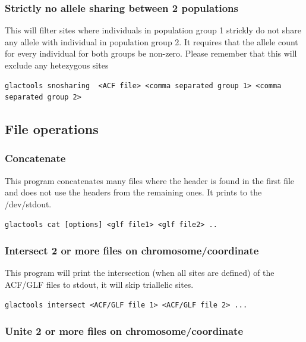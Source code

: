 \documentclass[a4paper]{article}
\begin{document}
\subsubsection{Strictly no allele sharing between 2 populations}
\noindent This will filter sites where individuals in population group 1 strickly do not share any allele with individual in population group 2.
It requires that the allele count for every individual for both groups be non-zero.
Please remember that this will exclude any hetezygous sites

\small
\begin{lstlisting}
glactools snosharing  <ACF file> <comma separated group 1> <comma separated group 2>
\end{lstlisting}
\normalsize



\subsection{File operations}

\subsubsection{Concatenate}
\noindent This program concatenates many files where the header is found in the first file and does not use the headers from the remaining ones. It prints to the /dev/stdout.

\begin{lstlisting}
glactools cat [options] <glf file1> <glf file2> .. 
\end{lstlisting}

\subsubsection{Intersect 2 or more files on chromosome/coordinate}

\noindent This program will print the intersection (when all sites are defined) of the ACF/GLF files to stdout, it will skip triallelic sites.

\begin{lstlisting}
glactools intersect <ACF/GLF file 1> <ACF/GLF file 2> ...
\end{lstlisting}

\subsubsection{Unite 2 or more files on chromosome/coordinate}
\end{document}
